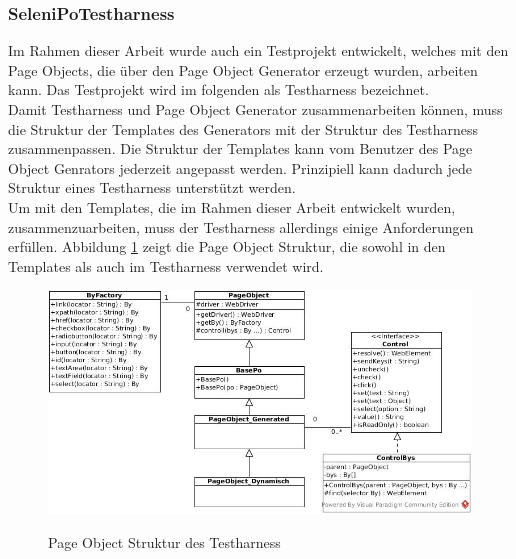 \subsubsection{SeleniPoTestharness}
\label{sec:selenipotestharness}

Im Rahmen dieser Arbeit wurde auch ein Testprojekt entwickelt, welches mit den Page Objects, die über den Page Object Generator erzeugt wurden, arbeiten kann.
Das Testprojekt wird im folgenden als Testharness bezeichnet.\\
Damit Testharness und Page Object Generator zusammenarbeiten können, muss die Struktur der Templates des Generators mit der Struktur des Testharness zusammenpassen.
Die Struktur der Templates kann vom Benutzer des Page Object Genrators jederzeit angepasst werden. Prinzipiell kann dadurch jede Struktur eines Testharness unterstützt werden.\\
Um mit den Templates, die im Rahmen dieser Arbeit entwickelt wurden, zusammenzuarbeiten, muss der Testharness allerdings einige Anforderungen erfüllen.
Abbildung \ref{fig:strukturTestharness} zeigt die Page Object Struktur, die sowohl in den Templates als auch im Testharness verwendet wird.\\
\begin{figure}[htb]
  \centering  
  \includegraphics[scale=0.49]{img/strukturTestharness.jpg}\\
  \caption{Page Object Struktur des Testharness}
  \label{fig:strukturTestharness}
\end{figure}

